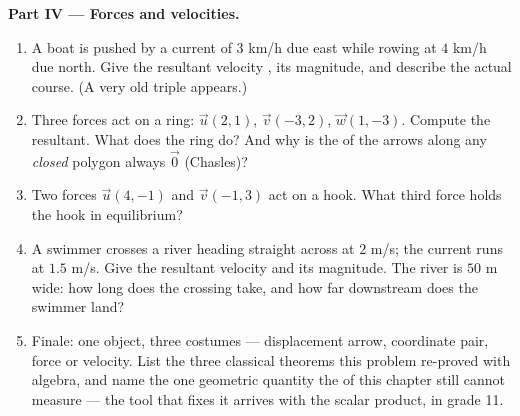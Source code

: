 \begin{problem}
\medskip
\noindent\textbf{Part IV --- Forces and velocities.}
\begin{enumerate}[resume]
  \item A boat is pushed by a current of $3$ km/h due east
        while rowing at $4$ km/h due north. Give the resultant
        velocity , its magnitude, and describe the actual
        course. (A very old triple appears.)
  \item Three forces act on a ring: $\vec u(2, 1)$,
        $\vec v(-3, 2)$, $\vec w(1, -3)$. Compute the resultant.
        What does the ring do? And why is the  of the arrows
        along any \emph{closed} polygon always $\vec 0$
        (Chasles)?
  \item Two forces $\vec u(4, -1)$ and $\vec v(-1, 3)$ act on a
        hook. What third force holds the hook in equilibrium?
  \item A swimmer crosses a river heading straight across at
        $2$ m/s; the current runs at $1.5$ m/s. Give the
        resultant velocity and its magnitude. The river is
        $50$ m wide: how long does the crossing take, and how
        far downstream does the swimmer land?
  \item Finale: one object, three costumes --- displacement
        arrow, coordinate pair, force or velocity. List the
        three classical theorems this problem re-proved with
         algebra, and name the one geometric quantity the
         of this chapter still cannot measure --- the
        tool that fixes it arrives with the scalar product, in
        grade 11.
\end{enumerate}
\end{problem}
